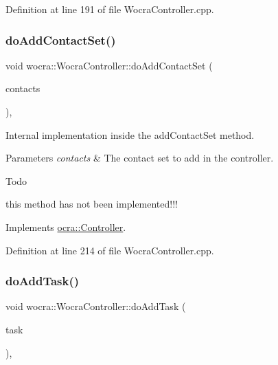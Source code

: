 Definition at line 191 of file Wocra\+Controller.\+cpp.

\hypertarget{classwocra_1_1WocraController_a74d8fa3103ca3787add351620c5bcf73}{}\label{classwocra_1_1WocraController_a74d8fa3103ca3787add351620c5bcf73} 
\subsubsection{\texorpdfstring{do\+Add\+Contact\+Set()}{doAddContactSet()}}
{\footnotesize\ttfamily void wocra\+::\+Wocra\+Controller\+::do\+Add\+Contact\+Set (\begin{DoxyParamCaption}\item[{const \hyperlink{classocra_1_1ContactSet}{Contact\+Set} \&}]{contacts }\end{DoxyParamCaption})\hspace{0.3cm}{\ttfamily [protected]}, {\ttfamily [virtual]}}

Internal implementation inside the add\+Contact\+Set method.


\begin{DoxyParams}{Parameters}
{\em contacts} & The contact set to add in the controller. \\
\hline
\end{DoxyParams}
\begin{DoxyRefDesc}{Todo}
\item[\hyperlink{todo__todo000003}{Todo}]this method has not been implemented!!! \end{DoxyRefDesc}


Implements \hyperlink{classocra_1_1Controller_acb11edc1ceaa89423c1e58f9cb38a9f7}{ocra\+::\+Controller}.



Definition at line 214 of file Wocra\+Controller.\+cpp.

\hypertarget{classwocra_1_1WocraController_aa9a681aa5c0f043638d4d2956c2913c1}{}\label{classwocra_1_1WocraController_aa9a681aa5c0f043638d4d2956c2913c1} 
\subsubsection{\texorpdfstring{do\+Add\+Task()}{doAddTask()}}
{\footnotesize\ttfamily void wocra\+::\+Wocra\+Controller\+::do\+Add\+Task (\begin{DoxyParamCaption}\item[{std\+::shared\+\_\+ptr$<$ \hyperlink{classocra_1_1Task}{Task} $>$}]{task }\end{DoxyParamCaption})\hspace{0.3cm}{\ttfamily [protected]}, {\ttfamily [virtual]}}

